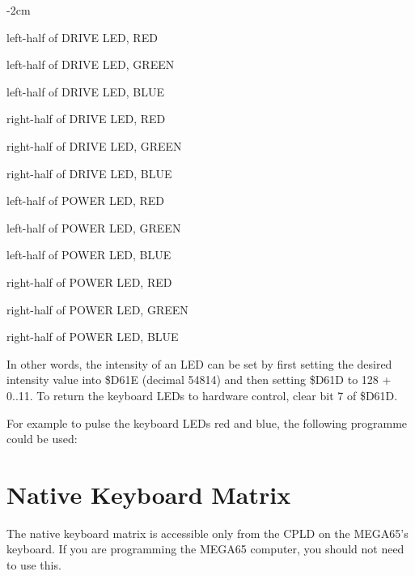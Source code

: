 \begin{adjustwidth}{}{-2cm}
\begin{description}[align=left,labelwidth=0.2cm]
\item[ 0] left-half of DRIVE LED, RED
\item[ 1] left-half of DRIVE LED, GREEN
\item[ 2] left-half of DRIVE LED, BLUE
\item[ 3] right-half of DRIVE LED, RED
\item[ 4] right-half of DRIVE LED, GREEN
\item[ 5] right-half of DRIVE LED, BLUE
\item[ 6] left-half of POWER LED, RED
\item[ 7] left-half of POWER LED, GREEN
\item[ 8] left-half of POWER LED, BLUE
\item[ 9] right-half of POWER LED, RED
\item[10] right-half of POWER LED, GREEN
\item[11] right-half of POWER LED, BLUE
\end{description}
\end{adjustwidth}

In other words, the intensity of an LED can be set by first setting the desired
intensity value into \$D61E (decimal 54814) and then setting \$D61D to 128 +
0..11.  To return the keyboard LEDs to hardware control, clear bit 7 of \$D61D.

For example to pulse the keyboard LEDs red and blue, the following programme
could be used:

\begin{tcolorbox}[colback=black,coltext=white]

\end{tcolorbox}

\section{Native Keyboard Matrix}

The native keyboard matrix is accessible only from the CPLD on the MEGA65's keyboard.
If you are programming the MEGA65 computer, you should not need to use this.

